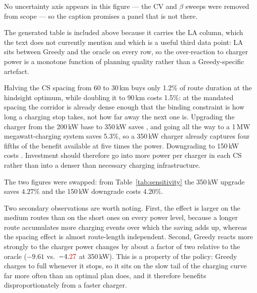 \begin{acmt}
No uncertainty axis appears in this figure --- the CV and $\beta$ sweeps were
removed from scope --- so the caption promises a panel that is not there.
\end{acmt}



\begin{acmt}
The generated table is included above because it carries the LA column, which
the text does not currently mention and which is a useful third data point:
LA sits between Greedy and the oracle on every row, so the over-reaction to
charger power is a monotone function of planning quality rather than a
Greedy-specific artefact.
\end{acmt}

Halving the CS spacing from 60 to 30\,km buys only 1.2\% of route duration at the hindsight optimum, while doubling it to 90\,km costs 1.5\%: at the mandated spacing the corridor is already dense enough that the binding constraint is how long a charging stop takes, not how far away the next one is.
Upgrading the charger from the 200\,kW base to 350\,kW saves , and going all the way to a 1\,MW megawatt-charging system saves 5.3\%, so a 350\,kW charger already captures four fifths of the benefit available at five times the power. Downgrading to 150\,kW costs .
Investment should therefore go into more power per charger in each CS rather than into a denser than necessary charging infrastructure.

\begin{afix}
The two figures were swapped: from Table~\ref{tab:sensitivity} the 350\,kW
upgrade saves $4.27\%$ and the 150\,kW downgrade costs $4.20\%$.
\end{afix}

Two secondary observations are worth noting.
First, the effect is larger on the medium routes than on the short ones on every power level, because a longer route accumulates more charging events over which the saving adds up, whereas the spacing effect is almost route-length independent.
Second, Greedy reacts more strongly to the charger power changes by about a factor of two relative to the oracle ($-9.61$ vs.\ $-4.\FIX{27}$ at 350\,kW). This is a property of the policy: Greedy charges to full whenever it stops, so it sits on the slow tail of the charging curve far more often than an optimal plan does, and it therefore benefits disproportionately from a faster charger. 

